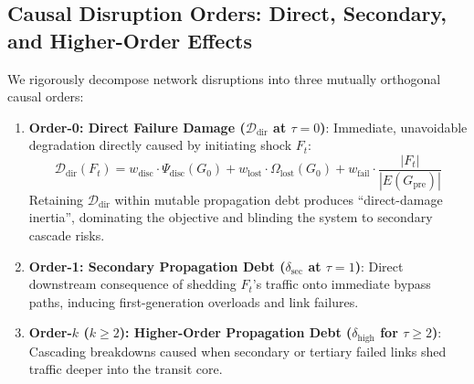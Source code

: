 \documentclass[pdflatex,sn-mathphys-num]{sn-jnl}
\theoremstyle{thmstyleone}
\theoremstyle{thmstyletwo}
\theoremstyle{thmstylethree}
\begin{document}
\subsection{Causal Disruption Orders: Direct, Secondary, and Higher-Order Effects}
We rigorously decompose network disruptions into three mutually orthogonal causal orders:
\begin{enumerate}
    \item \textbf{Order-0: Direct Failure Damage ($\mathcal{D}_{\mathrm{dir}}$ at $\tau=0$)}: Immediate, unavoidable degradation directly caused by initiating shock $F_t$:
    \begin{equation}
    \mathcal{D}_{\mathrm{dir}}(F_t) = w_{\mathrm{disc}} \cdot \Psi_{\mathrm{disc}}(G_0) + w_{\mathrm{lost}} \cdot \Omega_{\mathrm{lost}}(G_0) + w_{\mathrm{fail}} \cdot \frac{|F_t|}{|E(G_{\mathrm{pre}})|}
    \end{equation}
    Retaining $\mathcal{D}_{\mathrm{dir}}$ within mutable propagation debt produces ``direct-damage inertia'', dominating the objective and blinding the system to secondary cascade risks.
    \item \textbf{Order-1: Secondary Propagation Debt ($\delta_{\mathrm{sec}}$ at $\tau=1$)}: Direct downstream consequence of shedding $F_t$'s traffic onto immediate bypass paths, inducing first-generation overloads and link failures.
    \item \textbf{Order-$k$ ($k \ge 2$): Higher-Order Propagation Debt ($\delta_{\mathrm{high}}$ for $\tau \ge 2$)}: Cascading breakdowns caused when secondary or tertiary failed links shed traffic deeper into the transit core.
\end{enumerate}
\end{document}
